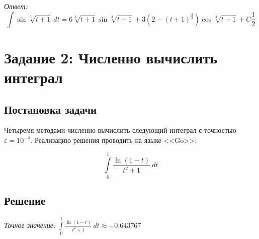 \documentclass[14pt, a4paper, titlepage, fleqn]{extarticle}
\begin{document}
        \textit{Ответ:} 
        \[
            \displaystyle
            \int \sin{ \sqrt[3]{t+1} } ~ dt
            = 6 \sqrt[3]{t+1} \sin{\sqrt[3]{t+1}}
            + 3\left( 2 - (t+1)^{\frac{2}{3}} \right) \cos{\sqrt[3]{t+1}} + C 
            \frac{1}{2}
        \]

    \pagebreak

    \section{Задание 2: Численно вычислить интеграл}
        \subsection{Постановка задачи}
            Четыремя методами численно вычислить следующий интеграл
            с точностью \( \varepsilon = 10^{-4} \).
            Реализацию решения проводить на языке <<Go>>:
            
            \[ \int\limits_0^1 \frac{\ln(1-t)}{t^2+1} ~ dt \]

        \subsection{Решение}
            \textit{Точное значение:}
            \( 
                \displaystyle
                \int\limits_0^1 \frac{\ln(1-t)}{t^2+1} ~ dt \approx -0.643767
            \)
\end{document}
